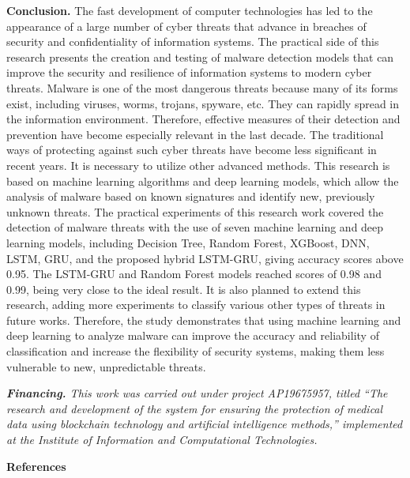 {\bfseries Conclusion.} The fast development of computer technologies has
led to the appearance of a large number of cyber threats that advance in
breaches of security and confidentiality of information systems. The
practical side of this research presents the creation and testing of
malware detection models that can improve the security and resilience of
information systems to modern cyber threats. Malware is one of the most
dangerous threats because many of its forms exist, including viruses,
worms, trojans, spyware, etc. They can rapidly spread in the information
environment. Therefore, effective measures of their detection and
prevention have become especially relevant in the last decade. The
traditional ways of protecting against such cyber threats have become
less significant in recent years. It is necessary to utilize other
advanced methods. This research is based on machine learning algorithms
and deep learning models, which allow the analysis of malware based on
known signatures and identify new, previously unknown threats. The
practical experiments of this research work covered the detection of
malware threats with the use of seven machine learning and deep learning
models, including Decision Tree, Random Forest, XGBoost, DNN, LSTM, GRU,
and the proposed hybrid LSTM-GRU, giving accuracy scores above 0.95. The
LSTM-GRU and Random Forest models reached scores of 0.98 and 0.99, being
very close to the ideal result. It is also planned to extend this
research, adding more experiments to classify various other types of
threats in future works. Therefore, the study demonstrates that using
machine learning and deep learning to analyze malware can improve the
accuracy and reliability of classification and increase the flexibility
of security systems, making them less vulnerable to new, unpredictable
threats.

\emph{{\bfseries Financing.} This work was carried out under project
AP19675957, titled ``The research and development of the system for
ensuring the protection of medical data using blockchain technology and
artificial intelligence methods,'' implemented at the Institute of
Information and Computational Technologies.}

{\bfseries References}

